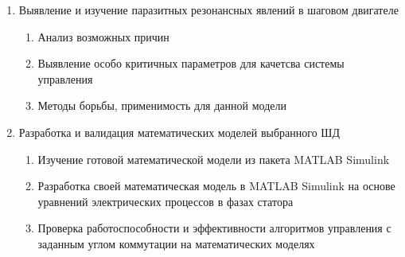 \begin{enumerate}
    \item{Выявление и изучение паразитных резонансных явлений в шаговом двигателе}
        \begin{enumerate}
            \item Анализ возможных причин
            \item Выявление особо критичных параметров для качетсва системы управления
            \item Методы борьбы, применимость для данной модели
        \end{enumerate}

    \item{Разработка и валидация математических моделей выбранного ШД}
        \begin{enumerate}
            \item Изучение готовой математической модели из пакета
                    \foreignlanguage{english}{MATLAB Simulink}
            \item Разработка своей математическая модель в
                    \foreignlanguage{english}{MATLAB Simulink} на основе
                    уравнений электрических процессов в фазах статора
            \item Проверка работоспособности и эффективности алгоритмов
                    управления с заданным углом коммутации на математических
                    моделях
        \end{enumerate}
\end{enumerate}
